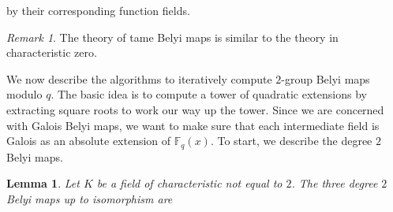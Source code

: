 \documentclass{dcthesis}
\newcommand{\PP}{\mathbb P}
\newcommand{\defi}[1]{\textsf{#1}}
\newcommand{\mm}[1]{{\color{blue} \sf MM: [#1]}}
\newcommand{\FF}{\mathbb{F}}
\DeclareMathOperator{\Mon}{Mon}
\numberwithin{equation}{section}
\newtheorem{lemma}[equation]{Lemma}
\theoremstyle{definition}
\newtheorem{definition}[equation]{Definition}
\theoremstyle{remark}
\newtheorem{remark}[equation]{Remark}
\begin{document}
{{{    by their corresponding function fields.
    \begin{remark}
      \label{rmk:tamebelyi}
      The theory of tame Belyi maps is
      similar to the theory in characteristic zero.
    \end{remark}
    We now describe the algorithms
    to iteratively compute $2$-group Belyi maps
    modulo $q$.
    The basic idea is to compute a tower
    of quadratic extensions
    by extracting square roots
    to work our way up the tower.
    Since we are concerned with Galois
    Belyi maps,
    we want to make sure
    that each intermediate field
    is Galois as an absolute extension
    of $\FF_q(x)$.
    To start,
    we describe
    the degree $2$ Belyi maps.
    \begin{lemma}
      \label{lem:degree2FF}
      Let $K$ be a field of characteristic not equal to $2$.
      The three degree $2$ Belyi maps
      up to isomorphism
      are
      \begin{equation}

\end{equation}
\end{lemma}}}}
\end{document}
